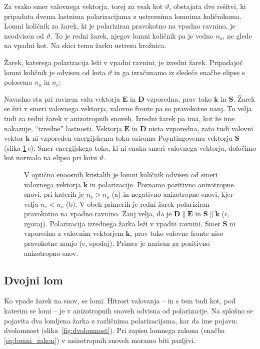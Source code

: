 Za vsako smer valovnega vektorja, torej za vsak kot $\vartheta$, obstajata dve rešitvi, 
ki pripadata dvema lastnima polarizacijama z ustreznima lomnima količnikoma. 
Lomni količnik za žarek, ki je polariziran pravokotno na vpadno ravnino, 
je neodvisen od $\vartheta$. To je redni žarek, njegov lomni količnik 
pa je vedno $n_o$, ne glede na vpadni kot. Na skici temu žarku ustreza krožnica.

Žarek, katerega polarizacija leži v vpadni ravnini, je izredni žarek. Pripadajoč
lomni količnik je odvisen od kota $\vartheta$ in 
ga izračunamo iz sledeče enačbe elipse s polosema $n_o$ in $n_e$: 

Navadno sta pri ravnem valu vektorja $\mathbf{E}$ in $\mathbf{D}$ vzporedna, 
prav tako $\mathbf{k}$ in $\mathbf{S}$. Žarek se širi v smeri valovnega vektorja, 
valovne fronte pa so pravokotne nanj. To velja tudi za redni žarek v anizotropnih
snoveh. Izredni žarek pa ima, kot že ime nakazuje, ``izredne'' lastnosti. Vektorja
$\mathbf{E}$ in $\mathbf{D}$ nista vzporedna, zato tudi valovni vektor $\mathbf{k}$ ni vzporeden
energijskemu toku oziroma Poyntingovemu vektorju $\mathbf{S}$ (slika \ref{fig:Elipsa}\,c). 
Smer energijskega toka, ki ni enaka smeri valovnega vektorja, določimo kot normalo 
na elipso pri kotu $\vartheta$. 

\begin{figure}[h]
\centering
\def\svgwidth{140truemm} 

\caption{V optično enoosnih kristalih je lomni količnik odvisen
od smeri valovnega vektorja $\mathbf{k}$ in polarizacije. Poznamo pozitivno anizotropne snovi, pri katerih
je $n_e>n_o$ (a) in negativno anizotropne snovi, kjer velja $n_e< n_o$ (b). V obeh primerih je redni 
žarek polariziran pravokotno na vpadno ravnino. Zanj velja, 
da je $\mathbf{D} \parallel \mathbf{E}$ in $\mathbf{S} \parallel \mathbf{k}$ (c, zgoraj). Polarizacija 
izrednega žarka leži v vpadni ravnini. Smer $\mathbf{S}$ ni vzporedna z valovnim vektorjem
$\mathbf{k}$, prav tako valovne fronte niso pravokotne nanjo (c, spodaj). Primer je narisan za pozitivno 
anizotropno snov.}
\label{fig:Elipsa}
\end{figure}
\subsection*{Dvojni lom}
Ko vpade žarek na snov, se lomi. Hitrost valovanja -- in s tem tudi 
kot, pod katerim se lomi -- je v anizotropnih snoveh odvisna od polarizacije. Na splošno
se pojavita dva lomljena žarka z različnima polarizacijama, kar
da ime pojavu: dvolomnost (slika~\ref{fig:dvolomnost}). Pri zapisu lomnega zakona (enačba \ref{eq:lomni_zakon}) v anizotropnih snoveh moramo biti pazljivi. 

